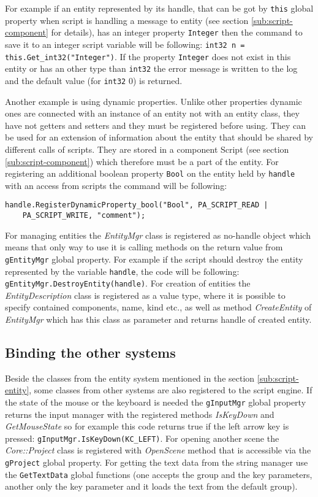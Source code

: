 For example if an entity represented by its handle, that can be got by \verb/this/ global property when script is handling a message to entity (see section \ref{sub:script-component} for details), has an integer property \verb/Integer/ then the command to save it to an integer script variable will be following: \verb/int32 n = this.Get_int32("Integer")/. If the property \verb/Integer/ does not exist in this entity or has an other type than \verb/int32/ the error message is written to the log and the default value (for \verb/int32/ 0) is returned.

Another example is using dynamic properties. Unlike other properties dynamic ones are connected with an instance of an entity not with an entity class, they have not getters and setters and they must be registered before using. They can be used for an extension of information about the entity that should be shared by different calls of scripts. They are stored in a component Script (see section \ref{sub:script-component}) which therefore must be a part of the entity. For registering an additional boolean property \verb/Bool/ on the entity held by \verb/handle/ with an access from scripts the command will be following:
\begin{verbatim}
handle.RegisterDynamicProperty_bool("Bool", PA_SCRIPT_READ |
    PA_SCRIPT_WRITE, "comment");
\end{verbatim}

For managing entities the \emph{EntityMgr} class is registered as no-handle object which means that only way to use it is calling methods on the return value from \verb/gEntityMgr/ global property. For example if the script should destroy the entity represented by the variable \verb/handle/, the code will be following: \verb/gEntityMgr.DestroyEntity(handle)/. For creation of entities the \emph{EntityDescription} class is registered as a value type, where it is possible to specify contained components, name, kind etc., as well as method \emph{CreateEntity} of \emph{EntityMgr} which has this class as parameter and returns handle of created entity.

\subsection{Binding the other systems}
\label{sub:script-systems}

Beside the classes from the entity system mentioned in the section \ref{sub:script-entity}, some classes from other systems are also registered to the script engine. If the state of the mouse or the keyboard is needed the \verb/gInputMgr/ global property returns the input manager with the registered methods \emph{IsKeyDown} and \emph{GetMouseState} so for example this code returns true if the left arrow key is pressed: \verb/gInputMgr.IsKeyDown(KC_LEFT)/. For opening another scene the \emph{Core::Project} class is registered with \emph{OpenScene} method that is accessible via the \verb/gProject/ global property. For getting the text data from the string manager use the \verb/GetTextData/ global functions (one accepts the group and the key parameters, another only the key parameter and it loads the text from the default group).

